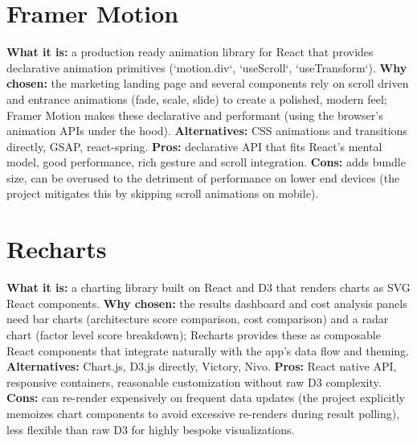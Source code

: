 \documentclass[11pt,a4paper]{report}
\begin{document}
\section{Framer Motion}
\textbf{What it is:} a production ready animation library for React that provides declarative animation primitives (`motion.div`, `useScroll`, `useTransform`).
\textbf{Why chosen:} the marketing landing page and several components rely on scroll driven and entrance animations (fade, scale, slide) to create a polished, modern feel; Framer Motion makes these declarative and performant (using the browser's animation APIs under the hood).
\textbf{Alternatives:} CSS animations and transitions directly, GSAP, react-spring.
\textbf{Pros:} declarative API that fits React's mental model, good performance, rich gesture and scroll integration.
\textbf{Cons:} adds bundle size, can be overused to the detriment of performance on lower end devices (the project mitigates this by skipping scroll animations on mobile).

\section{Recharts}
\textbf{What it is:} a charting library built on React and D3 that renders charts as SVG React components.
\textbf{Why chosen:} the results dashboard and cost analysis panels need bar charts (architecture score comparison, cost comparison) and a radar chart (factor level score breakdown); Recharts provides these as composable React components that integrate naturally with the app's data flow and theming.
\textbf{Alternatives:} Chart.js, D3.js directly, Victory, Nivo.
\textbf{Pros:} React native API, responsive containers, reasonable customization without raw D3 complexity.
\textbf{Cons:} can re-render expensively on frequent data updates (the project explicitly memoizes chart components to avoid excessive re-renders during result polling), less flexible than raw D3 for highly bespoke visualizations.
\end{document}
